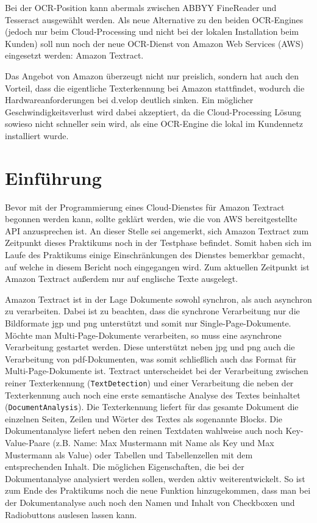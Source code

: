 \documentclass{whswinvcbook}
\begin{document}
Bei der OCR-Position kann abermals zwischen ABBYY FineReader und Tesseract ausgewählt werden. Als neue Alternative zu den beiden OCR-Engines (jedoch nur beim Cloud-Processing und nicht bei der lokalen Installation beim Kunden) soll nun noch der neue OCR-Dienst von Amazon Web Services (AWS) eingesetzt werden: Amazon Textract.

Das Angebot von Amazon überzeugt nicht nur preislich, sondern hat auch den Vorteil, dass die eigentliche Texterkennung bei Amazon stattfindet, wodurch die Hardwareanforderungen bei d.velop deutlich sinken. Ein möglicher Geschwindigkeitsverlust wird dabei akzeptiert, da die Cloud-Processing Lösung sowieso nicht schneller sein wird, als eine OCR-Engine die lokal im Kundennetz installiert wurde.
\section{Einführung}
Bevor mit der Programmierung eines Cloud-Dienstes für Amazon Textract begonnen werden kann, sollte geklärt werden, wie die von AWS bereitgestellte API anzusprechen ist. An dieser Stelle sei angemerkt, sich Amazon Textract zum Zeitpunkt dieses Praktikums noch in der Testphase befindet. Somit haben sich im Laufe des Praktikums einige Einschränkungen des Dienstes bemerkbar gemacht, auf welche in diesem Bericht noch eingegangen wird. Zum aktuellen Zeitpunkt ist Amazon Textract außerdem nur auf englische Texte ausgelegt.

Amazon Textract ist in der Lage Dokumente sowohl synchron, als auch asynchron zu verarbeiten. Dabei ist zu beachten, dass die synchrone Verarbeitung nur die Bildformate jgp und png unterstützt und somit nur Single-Page-Dokumente. Möchte man Multi-Page-Dokumente verarbeiten, so muss eine asynchrone Verarbeitung gestartet werden. Diese unterstützt neben jpg und png auch die Verarbeitung von pdf-Dokumenten, was somit schließlich auch das Format für Multi-Page-Dokumente ist. Textract unterscheidet bei der Verarbeitung zwischen reiner Texterkennung (\texttt{TextDetection}) und einer Verarbeitung die neben der Texterkennung auch noch eine erste semantische Analyse des Textes beinhaltet (\texttt{DocumentAnalysis}). Die Texterkennung liefert für das gesamte Dokument die einzelnen Seiten, Zeilen und Wörter des Textes als sogenannte Blocks. Die Dokumentanalyse liefert neben den reinen Textdaten wahlweise auch noch Key-Value-Paare (z.B. Name: Max Mustermann mit Name als Key und Max Mustermann als Value) oder Tabellen und Tabellenzellen mit dem entsprechenden Inhalt. Die möglichen Eigenschaften, die bei der Dokumentanalyse analysiert werden sollen, werden aktiv weiterentwickelt. So ist zum Ende des Praktikums noch die neue Funktion hinzugekommen, dass man bei der Dokumentanalyse auch noch den Namen und Inhalt von Checkboxen und Radiobuttons auslesen lassen kann.
\end{document}

